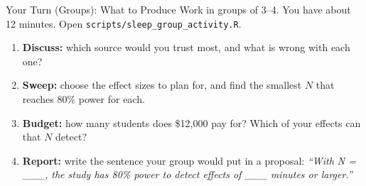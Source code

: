 \documentclass[
  ignorenonframetext,
  aspectratio=169,
]{beamer}
\newenvironment{Shaded}{\begin{snugshade}}{\end{snugshade}}
\newcommand{\AttributeTok}[1]{\textcolor[rgb]{0.40,0.45,0.13}{#1}}
\newcommand{\DecValTok}[1]{\textcolor[rgb]{0.68,0.00,0.00}{#1}}
\newcommand{\FunctionTok}[1]{\textcolor[rgb]{0.28,0.35,0.67}{#1}}
\newcommand{\NormalTok}[1]{\textcolor[rgb]{0.00,0.23,0.31}{#1}}
\newcommand{\OtherTok}[1]{\textcolor[rgb]{0.00,0.23,0.31}{#1}}
\newcommand{\SpecialCharTok}[1]{\textcolor[rgb]{0.37,0.37,0.37}{#1}}
\begin{document}
\begin{frame}[fragile]{Your Turn (Groups): What to Produce}
\label{your-turn-groups-what-to-produce}
\small Work in groups of 3--4. You have about 12 minutes. Open
\texttt{scripts/sleep\_group\_activity.R}.

\vspace{0.3em}

\footnotesize
\begin{enumerate}
\item \textbf{Discuss:} which source would you trust most, and what is wrong with each one?
\item \textbf{Sweep:} choose the effect sizes to plan for, and find the smallest $N$ that reaches 80\% power for each.
\item \textbf{Budget:} how many students does \$12{,}000 pay for? Which of your effects can that $N$ detect?
\item \textbf{Report:} write the sentence your group would put in a proposal: \textit{``With N = \_\_\_, the study has 80\% power to detect effects of \_\_\_ minutes or larger.''}
\end{enumerate}

\begin{Shaded}
\end{Shaded}
\end{frame}
\end{document}
